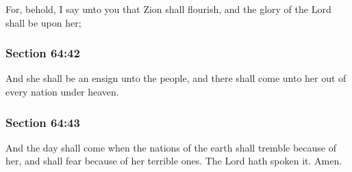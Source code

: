 		For, behold, I say unto you that Zion shall flourish, and the glory of the Lord shall be upon her;


	\subsubsection{Section 64:42} %
		\label{DC64-42}

		And she shall be an ensign unto the people, and there shall come unto her out of every nation under heaven.


	\subsubsection{Section 64:43} %
		\label{DC64-43}

		And the day shall come when the nations of the earth shall tremble because of her, and shall fear because of her terrible ones.  The Lord hath spoken it.  Amen.

